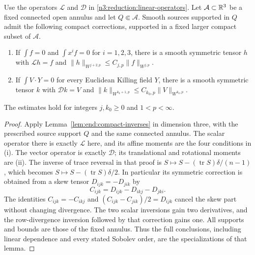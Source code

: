 \begin{lemma}
\label{n3:reduction:compact-inverses}
Use the operators $\mathcal L$ and $\mathcal D$ in
\eqref{n3:reduction:linear-operators}.
Let $\mathcal A\subset\mathbb R^3$ be a fixed connected open annulus and let
$Q\Subset\mathcal A$.  Smooth sources supported in $Q$ admit the
following compact corrections, supported in a fixed larger compact
subset of $\mathcal A$.
\begin{enumerate}[label=\textup{(\roman*)}]
\item If $\int f=0$ and $\int x^if=0$ for $i=1,2,3$, there is a smooth
      symmetric tensor $h$ with $\mathcal Lh=f$ and
      $\|h\|_{W^{j+2,p}}\le C_{j,p}\|f\|_{W^{j,p}}$.
\item If $\int V\cdot Y=0$ for every Euclidean Killing field $Y$, there
      is a smooth symmetric tensor $k$ with $\mathcal Dk=V$ and
      $\|k\|_{W^{k_0+1,p}}\le C_{k_0,p}\|V\|_{W^{k_0,p}}$.
\end{enumerate}
The estimates hold for integers $j,k_0\ge0$ and $1<p<\infty$.
\end{lemma}

\begin{proof}
Apply Lemma~\ref{lem:end:compact-inverses} in dimension three, with
the prescribed source support $Q$ and the same connected annulus.
The scalar operator there is exactly $\mathcal L$ here, and its affine
moments are the four conditions in (i). The vector operator is exactly
$\mathcal D$; its translational and rotational moments are (ii).
The inverse of trace reversal in that proof is
$S\mapsto S-(\operatorname{tr}S)\delta/(n-1)$, which becomes
$S\mapsto S-(\operatorname{tr}S)\delta/2$. In particular its symmetric
correction is obtained from a skew tensor $D_{ijk}=-D_{jik}$ by
\begin{equation}\label{n3:reduction:stress-symmetrization}
 C_{ijk}=D_{ijk}-D_{ikj}-D_{jki}.
\end{equation}
The identities $C_{ijk}=-C_{ikj}$ and
$(C_{ijk}-C_{jik})/2=D_{ijk}$ cancel the skew part without changing
divergence. The two scalar inversions gain two derivatives, and the
row-divergence inversion followed by that correction gains one.
All supports and bounds are those of the fixed annulus. Thus the full
conclusions, including linear dependence and every stated Sobolev order,
are the specializations of that lemma.
\end{proof}

